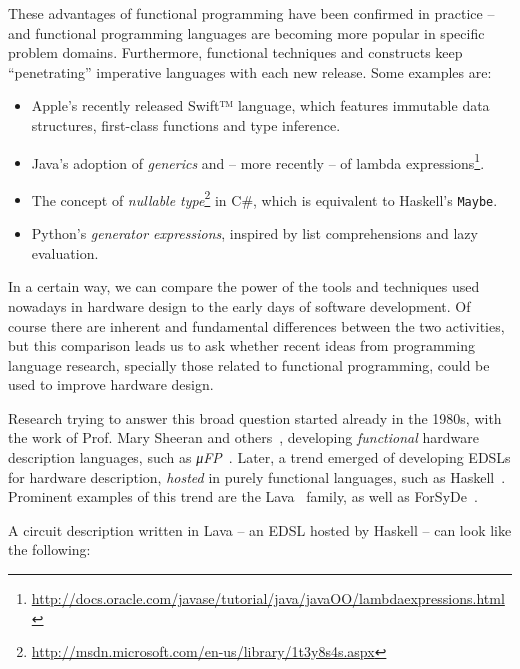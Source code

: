     These advantages of functional programming have been confirmed in practice -- and
    functional programming languages are becoming more popular in specific problem domains.
    Furthermore, functional techniques and constructs keep ``penetrating'' imperative languages
    with each new release. Some examples are:

    \begin{itemize}
        \item Apple's recently released Swift™ language, which features immutable data structures,
            first-class functions and type inference.
        \item Java's adoption of \emph{generics} and -- more recently -- of lambda
            expressions\footnote{\url{http://docs.oracle.com/javase/tutorial/java/javaOO/lambdaexpressions.html}}.
        \item The concept of \emph{nullable type}\footnote{\url{http://msdn.microsoft.com/en-us/library/1t3y8s4s.aspx}}
            in C\#, which is equivalent to Haskell's \texttt{Maybe}.
        \item Python's \emph{generator expressions}, inspired by list comprehensions and lazy evaluation.
    \end{itemize}

    In a certain way, we can compare the power of the tools and techniques
    used nowadays in hardware design to the early days of software development.
    Of course there are inherent and fundamental differences between the two activities, but
    this comparison leads us to ask whether recent ideas from programming language research,
    specially those related to functional programming, could be used to improve hardware design.

    Research trying to answer this broad question started already in the 1980s,
    with the work of Prof. Mary Sheeran and others~\cite{sheeran-survey},
    developing \emph{functional} hardware description languages, such as \emph{μFP}~\cite{mufp-1984}.
    Later, a trend emerged of developing \acp{EDSL} for hardware description,
    \emph{hosted} in purely functional languages, such as Haskell~\cite{haskell2010}.
    Prominent examples of this trend are the Lava~\cite{lava-1999} family,
    as well as ForSyDe~\cite{forsyde1999}.

    A circuit description written in Lava -- an \ac{EDSL} hosted by Haskell -- can look like the following:

